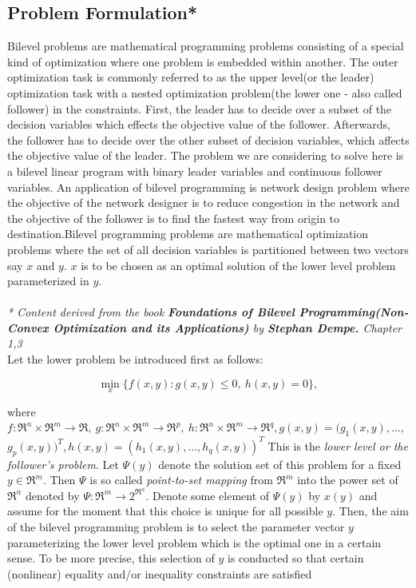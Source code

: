 \documentclass[a4paper, 12pt]{article}
\begin{document}
\subsection{Problem Formulation*}
Bilevel problems are mathematical programming problems consisting of a special kind of optimization where one problem is embedded within another. The outer optimization task is commonly referred to as the upper level(or the leader) optimization task with a nested optimization problem(the lower one - also called follower) in the constraints. First, the leader has to decide over a subset of the decision variables which effects the objective value of the follower. Afterwards, the follower has to decide over the other subset of decision variables, which affects the objective value of the leader. The problem we are considering to solve here is a bilevel linear program with binary leader variables and continuous follower variables. An application of bilevel programming is network design problem where the objective of the network designer is to reduce congestion in the network and the objective of the follower is to find the fastest way from origin to destination.Bilevel programming problems are mathematical optimization problems where the set of all decision variables is partitioned between two vectors say $x$ and $y$. $x$ is to be chosen as an optimal solution of the lower level problem parameterized in $y$.\\~\\
\small\textit{*  Content derived from the book \textbf{Foundations of Bilevel Programming(Non-Convex Optimization and its Applications)} by \textbf{Stephan Dempe.} Chapter 1,3}\\
\noindent
Let the lower problem be introduced first as follows:
\begin{large}
\boldmath\begin{equation*}
\min_{x}\{f(x,y):g(x,y)\leq0,\ h(x,y)=0\},
\end{equation*}
\end{large}
where $f:\Re^{n}\times\Re^{m}\rightarrow\Re,\ g:\Re^{n}\times\Re^{m}\rightarrow\Re^{p},\ h:\Re^{n}\times\Re^{m}\rightarrow\Re^{q}, g(x,y)=(g_{1}(x,y),...,$\\
$g_{p}(x,y))^{T}, h(x,y)=(h_{1}(x,y),...,h_{q}(x,y))^{T}$ This is the \textit{lower level or the follower's problem}. Let $\Psi\left(y\right)$ denote the solution set of this problem for a fixed $y\in\Re^{m}$. Then $\Psi$ is so called \textit{point-to-set mapping} from $\Re^{m}$ into the power set of $\Re^{n}$ denoted by $\Psi:\Re^{m}\rightarrow2^{\Re^{n}}$. Denote some element of $\Psi(y)$ by $x\left(y\right)$ and assume for the moment that this choice is unique for all possible $y$. Then, the aim of the bilevel programming problem is to select the parameter vector $y$ parameterizing the lower level problem which is the optimal one in a certain sense. To be more precise, this selection of $y$ is conducted so that certain (nonlinear) equality and/or inequality constraints are satisfied
\end{document}
